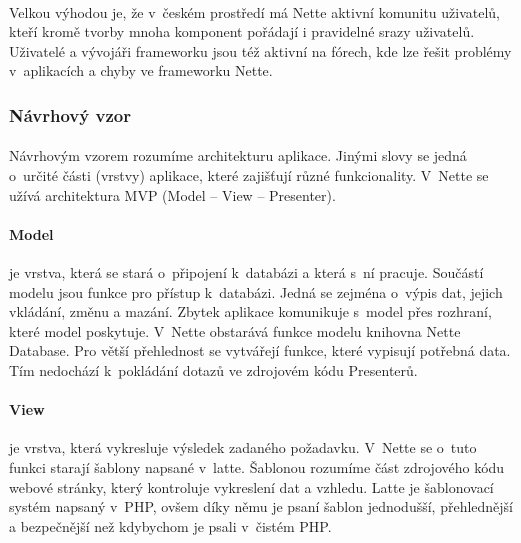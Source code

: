 \documentclass[11pt,a4paper,titlepage,oneside]{book}
\begin{document}
			\paragraph{} Velkou výhodou je, že v~českém prostředí má Nette aktivní komunitu uživatelů, kteří kromě tvorby mnoha komponent pořádají i pravidelné srazy uživatelů.  Uživatelé a vývojáři frameworku jsou též aktivní na fórech, kde lze řešit problémy v~aplikacích a chyby ve frameworku Nette.
			\subsubsection*{Návrhový vzor}
				\paragraph{} Návrhovým vzorem rozumíme architekturu aplikace. Jinými slovy se jedná o~určité části (vrstvy) aplikace, které zajišťují různé funkcionality. V~Nette se užívá architektura MVP (Model -- View -- Presenter).

				\paragraph{Model} je vrstva, která se stará o~připojení k~databázi a která s~ní pracuje. Součástí modelu jsou funkce pro přístup k~databázi. Jedná se zejména o~výpis dat, jejich vkládání, změnu a mazání. Zbytek aplikace komunikuje s~model přes rozhraní, které model poskytuje. V~Nette obstarává funkce modelu knihovna Nette Database. Pro větší přehlednost se vytvářejí funkce, které vypisují potřebná data. Tím nedochází k~pokládání dotazů ve zdrojovém kódu Presenterů.



				\paragraph{View} je vrstva, která vykresluje výsledek zadaného požadavku. V~Nette se o~tuto funkci starají šablony napsané v~latte. Šablonou rozumíme část zdrojového kódu webové stránky, který kontroluje vykreslení dat a vzhledu. Latte je šablonovací systém napsaný v~\ac{PHP}, ovšem díky němu je psaní šablon jednodušší, přehlednější a bezpečnější než kdybychom je psali v~čistém PHP.
\end{document}
